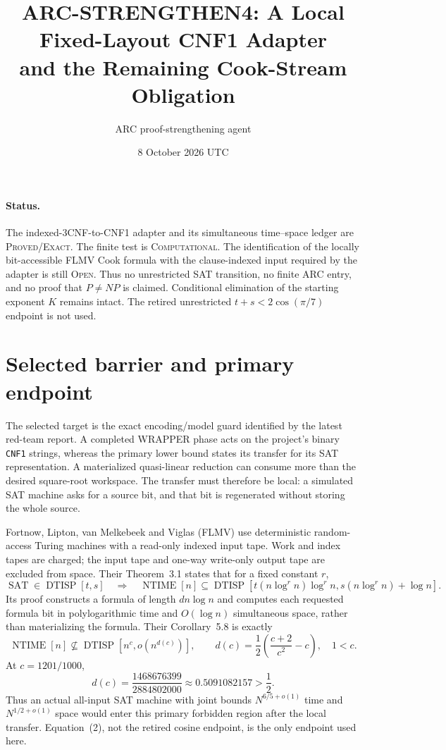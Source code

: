 \documentclass[11pt]{article}
\title{ARC-STRENGTHEN4: A Local Fixed-Layout CNF1 Adapter\\and the Remaining Cook-Stream Obligation}
\author{ARC proof-strengthening agent}
\date{8 October 2026 UTC}
\newcommand{\SAT}{\operatorname{SAT}}
\newcommand{\DTISP}{\operatorname{DTISP}}
\begin{document}
\sloppy\maketitle

\paragraph{Status.}
The indexed-3CNF-to-CNF1 adapter and its simultaneous time--space ledger are
\textsc{Proved/Exact}.  The finite test is \textsc{Computational}.  The
identification of the locally bit-accessible FLMV Cook formula with the
clause-indexed input required by the adapter is still \textsc{Open}.  Thus no
unrestricted SAT transition, no finite ARC entry, and no proof that
$P\ne NP$ is claimed.  Conditional elimination of the starting exponent
$K$ remains intact.  The retired unrestricted
$t+s<2\cos(\pi/7)$ endpoint is not used.

\section{Selected barrier and primary endpoint}

The selected target is the exact encoding/model guard identified by the
latest red-team report.  A completed WRAPPER phase acts on the project's
binary \texttt{CNF1} strings, whereas the primary lower bound states its
transfer for its SAT representation.  A materialized quasi-linear reduction
can consume more than the desired square-root workspace.  The transfer must
therefore be local: a simulated SAT machine asks for a source bit, and that
bit is regenerated without storing the whole source.

Fortnow, Lipton, van Melkebeek and Viglas (FLMV) use deterministic
random-access Turing machines with a read-only indexed input tape.  Work and
index tapes are charged; the input tape and one-way write-only output tape are
excluded from space.  Their Theorem~3.1 states that for a fixed constant $r$,
\[
 \SAT\in\DTISP[t,s]
 \quad\Longrightarrow\quad
 \operatorname{NTIME}[n]\subseteq
 \DTISP\!\left[t(n\log^r n)\log^r n,
                s(n\log^r n)+\log n\right].                 \tag{1}
\]
Its proof constructs a formula of length $d n\log n$ and computes each
requested formula bit in polylogarithmic time and $O(\log n)$ simultaneous
space, rather than materializing the formula.  Their Corollary~5.8 is exactly
\[
 \operatorname{NTIME}[n]\not\subseteq
 \DTISP\!\left[n^c,o\!\left(n^{d(c)}\right)\right],
 \qquad
 d(c)=\frac12\left(\frac{c+2}{c^2}-c\right),
 \quad 1<c.                                                  \tag{2}
\]
At $c=1201/1000$,
\[
 d(c)=\frac{1468676399}{2884802000}
      \approx 0.5091082157>\frac12.                          \tag{3}
\]
Thus an actual all-input SAT machine with joint bounds
$N^{6/5+o(1)}$ time and $N^{1/2+o(1)}$ space would enter this primary
forbidden region after the local transfer.  Equation~(2), not the retired
cosine endpoint, is the only endpoint used here.
\end{document}
